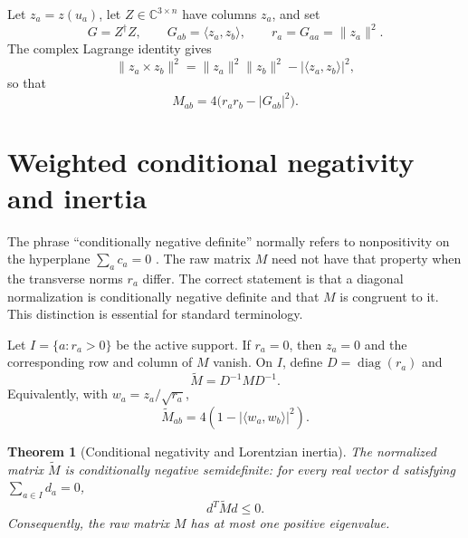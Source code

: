 \documentclass[11pt]{article}
\newcommand{\C}{\mathbb{C}}
\newcommand{\diag}{\operatorname{diag}}
\newcommand{\norm}[1]{\lVert #1\rVert}
\newcommand{\abs}[1]{\lvert #1\rvert}
\newcommand{\ip}[2]{\langle #1,#2\rangle}
\newtheorem{theorem}{Theorem}[section]
\theoremstyle{remark}
\begin{document}
Let $z_a=z(u_a)$, let $Z\in\C^{3\times n}$ have columns $z_a$, and set
\begin{equation}
 G=Z^\dagger Z,
 \qquad G_{ab}=\ip{z_a}{z_b},
 \qquad r_a=G_{aa}=\norm{z_a}^2.
 \label{eq:Gram}
\end{equation}
The complex Lagrange identity gives
\begin{equation}
 \norm{z_a\times z_b}^2
 =\norm{z_a}^2\norm{z_b}^2-\abs{\ip{z_a}{z_b}}^2,
\end{equation}
so that
\begin{equation}
 M_{ab}=4\bigl(r_a r_b-\abs{G_{ab}}^2\bigr).
 \label{eq:M-Gram}
\end{equation}

\section{Weighted conditional negativity and inertia}

The phrase ``conditionally negative definite'' normally refers to nonpositivity on the hyperplane $\sum_a c_a=0$ \cite{Schoenberg1938}.  The raw matrix $M$ need not have that property when the transverse norms $r_a$ differ.  The correct statement is that a diagonal normalization is conditionally negative definite and that $M$ is congruent to it.  This distinction is essential for standard terminology.

Let $I=\{a:r_a>0\}$ be the active support.  If $r_a=0$, then $z_a=0$ and the corresponding row and column of $M$ vanish.  On $I$, define $D=\diag(r_a)$ and
\begin{equation}
 \widetilde M=D^{-1}MD^{-1}.
 \label{eq:Mtilde}
\end{equation}
Equivalently, with $w_a=z_a/\sqrt{r_a}$,
\begin{equation}
 \widetilde M_{ab}=4\left(1-\abs{\ip{w_a}{w_b}}^2\right).
 \label{eq:normalized-CND}
\end{equation}

\begin{theorem}[Conditional negativity and Lorentzian inertia]
The normalized matrix $\widetilde M$ is conditionally negative semidefinite: for every real vector $d$ satisfying $\sum_{a\in I}d_a=0$,
\begin{equation}
 d^T\widetilde M d\le0.
 \label{eq:CND}
\end{equation}
Consequently, the raw matrix $M$ has at most one positive eigenvalue.
\end{theorem}
\end{document}
